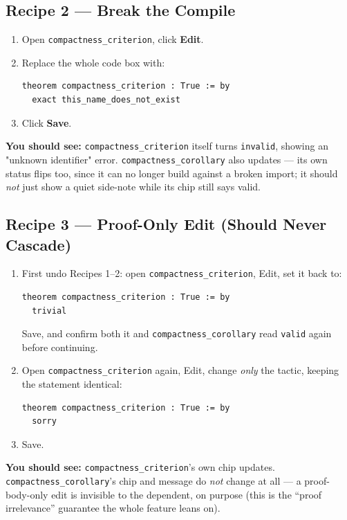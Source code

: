 \documentclass[11pt]{article}
\newcommand{\code}[1]{\texttt{#1}}
\newcommand{\see}[1]{\textbf{You should see:} #1}
\begin{document}
\subsection*{Recipe 2 --- Break the Compile}
\begin{enumerate}[label=\arabic*.]
  \item Open \code{compactness\_criterion}, click \textbf{Edit}.
  \item Replace the whole code box with:
\begin{verbatim}
theorem compactness_criterion : True := by
  exact this_name_does_not_exist
\end{verbatim}
  \item Click \textbf{Save}.
\end{enumerate}
\see{\code{compactness\_criterion} itself turns \code{invalid}, showing an
"unknown identifier" error. \code{compactness\_corollary} also updates ---
its own status flips too, since it can no longer build against a broken
import; it should \emph{not} just show a quiet side-note while its chip still
says valid.}

\subsection*{Recipe 3 --- Proof-Only Edit (Should Never Cascade)}
\begin{enumerate}[label=\arabic*.]
  \item First undo Recipes 1--2: open \code{compactness\_criterion}, Edit,
    set it back to:
\begin{verbatim}
theorem compactness_criterion : True := by
  trivial
\end{verbatim}
    Save, and confirm both it and \code{compactness\_corollary} read
    \code{valid} again before continuing.
  \item Open \code{compactness\_criterion} again, Edit, change \emph{only}
    the tactic, keeping the statement identical:
\begin{verbatim}
theorem compactness_criterion : True := by
  sorry
\end{verbatim}
  \item Save.
\end{enumerate}
\see{\code{compactness\_criterion}'s own chip updates. \code{compactness\_corollary}'s
chip and message do \emph{not} change at all --- a proof-body-only edit is
invisible to the dependent, on purpose (this is the ``proof irrelevance''
guarantee the whole feature leans on).}
\end{document}
